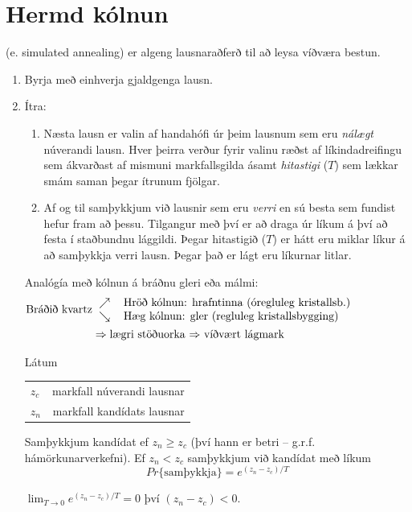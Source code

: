 \section{Hermd kólnun}
 (e. simulated annealing) er algeng lausnaraðferð til að leysa víðværa bestun.
\begin{enumerate}
  \item Byrja með einhverja gjaldgenga lausn.
  \item Ítra:
  \begin{enumerate}
    \item Næsta lausn er valin af handahófi úr þeim lausnum sem eru \emph{nálægt} núverandi lausn. Hver þeirra verður fyrir valinu ræðst af líkindadreifingu sem ákvarðast af mismuni markfallsgilda ásamt \emph{hitastigi} ($T$) sem lækkar smám saman þegar ítrunum fjölgar.
    \item Af og til samþykkjum við lausnir sem eru \emph{verri} en sú besta sem fundist hefur fram að þessu. Tilgangur með því er að draga úr líkum á því að festa í staðbundnu lággildi.
    \subitem Þegar hitastigið ($T$) er hátt eru miklar líkur á að samþykkja verri lausn. Þegar það er lágt eru líkurnar litlar.
  \end{enumerate}
  \begin{aths}Analógía með kólnun á bráðnu gleri eða málmi:
  \begin{eqnarray*} \mbox{Bráðið kvartz}  & \begin{tabular}{cp{9cm}} 
    $\nearrow$ & Hröð kólnun: hrafntinna (óregluleg kristallsb.) \\
    $\searrow$ & Hæg kólnun: gler (regluleg kristallsbygging) \end{tabular}\\ &  \Rightarrow \mbox{lægri stöðuorka $\Rightarrow$ víðvært lágmark}\end{eqnarray*}
  \end{aths}
  Látum
  \begin{center}\begin{tabular}{lr}
    $z_c$ & markfall núverandi lausnar \\
    $z_n$ & markfall kandídats lausnar
  \end{tabular}\end{center}

  Samþykkjum kandídat ef $z_n\geq z_c$ (því hann er betri -- g.r.f. hámörkunarverkefni). Ef $z_n<z_c$ samþykkjum við kandídat með líkum
 \[ Pr\{\mbox{samþykkja}\}=e^{(z_n-z_c)/T} \]
\begin{aths}$\lim_{T\to0} e^{(z_n-z_c)/T}=0$ því $(z_n-z_c)<0$.\end{aths}
\end{enumerate}

